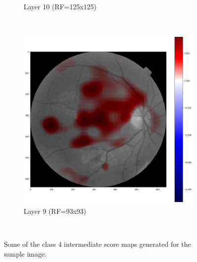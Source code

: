 \documentclass[review]{elsarticle}
\theoremstyle{definition} %
\theoremstyle{remark}
\begin{document}
\begin{figure}[!ht]
\begin{subfigure}{0.45\textwidth}
		\caption{Layer 10 (RF=125x125)}
		\label{fig:score_rf125}
	\end{subfigure}
	~ %
	\begin{subfigure}{0.45\textwidth}
		\includegraphics[width=\textwidth]{./figures/maps/rf93c.png}
		\caption{Layer 9 (RF=93x93)}
		\label{fig:score_r93}
	\end{subfigure}\\
	\caption{Some of the class 4 intermediate score maps generated for the sample image.}
	\label{fig:scoremaps1}
\end{figure}


 
\end{document}
